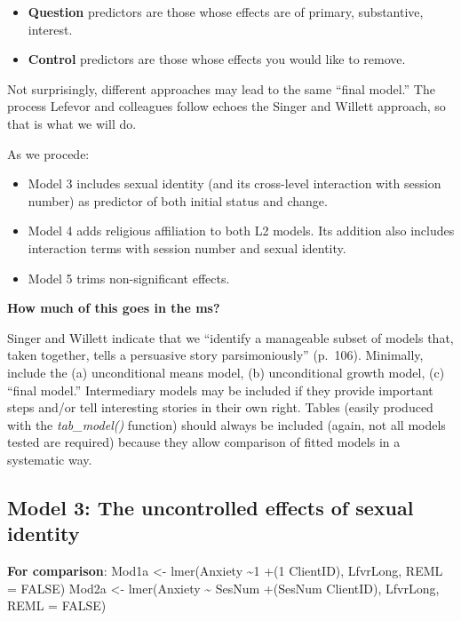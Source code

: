 \documentclass[
  english,
]{book}
\providecommand{\tightlist}{%
  \setlength{\itemsep}{0pt}\setlength{\parskip}{0pt}}
\begin{document}
\begin{itemize}
\tightlist
\item
  \textbf{Question} predictors are those whose effects are of primary, substantive, interest.
\item
  \textbf{Control} predictors are those whose effects you would like to remove.
\end{itemize}

Not surprisingly, different approaches may lead to the same ``final model.'' The process Lefevor and colleagues \citeyearpar{lefevor_religious_2017} follow echoes the Singer and Willett \citeyearpar{singer_applied_2003} approach, so that is what we will do.

As we procede:

\begin{itemize}
\tightlist
\item
  Model 3 includes sexual identity (and its cross-level interaction with session number) as predictor of both initial status and change.
\item
  Model 4 adds religious affiliation to both L2 models. Its addition also includes interaction terms with session number and sexual identity.
\item
  Model 5 trims non-significant effects.
\end{itemize}

\textbf{How much of this goes in the ms?}

Singer and Willett\citeyearpar{singer_applied_2003} indicate that we ``identify a manageable subset of models that, taken together, tells a persuasive story parsimoniously'' (p.~106). Minimally, include the (a) unconditional means model, (b) unconditional growth model, (c) ``final model.'' Intermediary models may be included if they provide important steps and/or tell interesting stories in their own right.
Tables (easily produced with the \emph{tab\_model()} function) should always be included (again, not all models tested are required) because they allow comparison of fitted models in a systematic way.

\hypertarget{model-3-the-uncontrolled-effects-of-sexual-identity}{%
\subsection{Model 3: The uncontrolled effects of sexual identity}\label{model-3-the-uncontrolled-effects-of-sexual-identity}}

\textbf{For comparison}:
Mod1a \textless- lmer(Anxiety \textasciitilde1 +(1 \textbar{} ClientID), LfvrLong, REML = FALSE)
Mod2a \textless- lmer(Anxiety \textasciitilde{} SesNum +(SesNum \textbar{} ClientID), LfvrLong, REML = FALSE)
\end{document}
